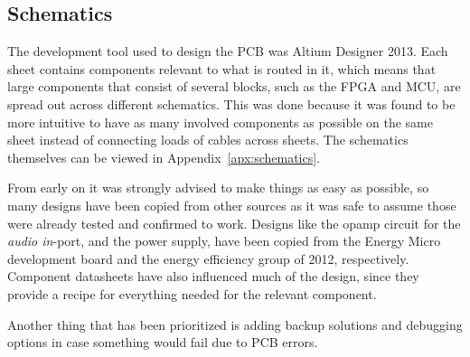 
\subsection{Schematics}

The development tool used to design the PCB was Altium Designer
2013. Each sheet contains components relevant to what is routed
in it, which means that large components that consist of
several blocks, such as the FPGA and MCU, are spread out across
different schematics. This was done because it was found to be
more intuitive to have as many involved components as possible
on the same sheet instead of connecting loads of cables across
sheets. The schematics themselves can be viewed in
Appendix~\ref{apx:schematics}.

From early on it was strongly advised to make things as easy as
possible, so many designs have been copied from other sources as
it was safe to assume those were already tested and confirmed to
work. Designs like the opamp circuit for the \emph{audio
in}-port, and the power supply, have been copied from the Energy
Micro development board and the energy efficiency group of 2012,
respectively. Component datasheets have also influenced much of
the design, since they provide a recipe for everything needed
for the relevant component.

Another thing that has been prioritized is adding backup
solutions and debugging options in case something would fail
due to PCB errors. 

